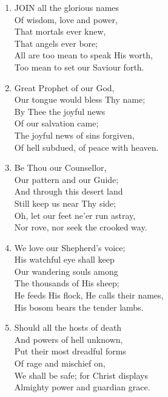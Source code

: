 \documentclass[11pt,a4paper]{article}
\begin{document}
\begin{enumerate}
    \item JOIN all the glorious names \\
        Of wisdom, love and power, \\
        That mortals ever knew, \\
        That angels ever bore; \\
        All are too mean to speak His worth, \\
        Too mean to set our Saviour forth.

    \item Great Prophet of our God, \\
        Our tongue would bless Thy name; \\
        By Thee the joyful news \\
        Of our salvation came; \\
        The joyful news of sins forgiven, \\
        Of hell subdued, of peace with heaven.

    \item Be Thou our Counsellor, \\
        Our pattern and our Guide; \\
        And through this desert land \\
        Still keep us near Thy side; \\
        Oh, let our feet ne'er run astray, \\
        Nor rove, nor seek the crooked way.

    \item We love our Shepherd's voice; \\
        His watchful eye shall keep \\
        Our wandering souls among \\
        The thousands of His sheep; \\
        He feeds His flock, He calls their names, \\
        His bosom bears the tender lambs.

    \item Should all the hosts of death \\
        And powers of hell unknown, \\
        Put their most dreadful forms \\
        Of rage and mischief on, \\
        We shall be safe; for Christ displays \\
        Almighty power and guardian grace.

\end{enumerate}
\end{document}

